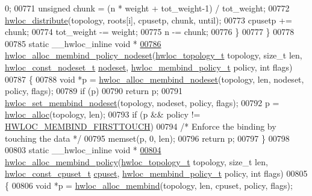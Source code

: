 \begin{DoxyCode}
      0;
00771     \textcolor{keywordtype}{unsigned} chunk = (n * weight + tot\_weight-1) / tot\_weight;
00772     \hyperlink{a00059_ga6d5c88292ad5aa062c1bebc99369c042}{hwloc_distribute}(topology, roots[i], cpusetp, chunk, until);
00773     cpusetp += chunk;
00774     tot\_weight -= weight;
00775     n -= chunk;
00776   \}
00777 \}
00778 
00785 \textcolor{keyword}{static} \_\_hwloc\_inline \textcolor{keywordtype}{void} *
\hypertarget{a00031_source_l00786}{}\hyperlink{a00059_ga3e772fbc4de626ed80f13d332b7d4d03}{00786} \hyperlink{a00059_ga3e772fbc4de626ed80f13d332b7d4d03}{hwloc_alloc_membind_policy_nodeset}(\hyperlink{a00039_ga9d1e76ee15a7dee158b786c30b6a6e38}{hwloc_topology_t} topology, \textcolor{keywordtype}{size\_t} len, 
      \hyperlink{a00040_ga2f5276235841ad66a79bedad16a5a10c}{hwloc_const_nodeset_t} \hyperlink{a00016_a08f0d0e16c619a6e653526cbee4ffea3}{nodeset}, \hyperlink{a00050_gac9764f79505775d06407b40f5e4661e8}{hwloc_membind_policy_t} policy, \textcolor{keywordtype}{int} flags)
00787 \{
00788   \textcolor{keywordtype}{void} *p = \hyperlink{a00050_gaeaa00714a9c4319bda0a74ca6f8720e8}{hwloc_alloc_membind_nodeset}(topology, len, nodeset, policy, flags);
00789   \textcolor{keywordflow}{if} (p)
00790     \textcolor{keywordflow}{return} p;
00791   \hyperlink{a00050_ga747962cbb16fd12ad6d126011c734a27}{hwloc_set_membind_nodeset}(topology, nodeset, policy, flags);
00792   p = \hyperlink{a00050_gac5586e58cf25c3596b7d4aa31ce13259}{hwloc_alloc}(topology, len);
00793   \textcolor{keywordflow}{if} (p && policy != \hyperlink{a00050_ggac9764f79505775d06407b40f5e4661e8a979c7aa78dd32780858f30f47a72cca0}{HWLOC_MEMBIND_FIRSTTOUCH})
00794     \textcolor{comment}{/* Enforce the binding by touching the data */}
00795     memset(p, 0, len);
00796   \textcolor{keywordflow}{return} p;
00797 \}
00798 
00803 \textcolor{keyword}{static} \_\_hwloc\_inline \textcolor{keywordtype}{void} *
\hypertarget{a00031_source_l00804}{}\hyperlink{a00059_ga6178c6a9ec1dd88ec9f6a9fcdcc7d634}{00804} \hyperlink{a00059_ga6178c6a9ec1dd88ec9f6a9fcdcc7d634}{hwloc_alloc_membind_policy}(\hyperlink{a00039_ga9d1e76ee15a7dee158b786c30b6a6e38}{hwloc_topology_t} topology, \textcolor{keywordtype}{size\_t} len, 
      \hyperlink{a00040_ga1f784433e9b606261f62d1134f6a3b25}{hwloc_const_cpuset_t} \hyperlink{a00016_a67925e0f2c47f50408fbdb9bddd0790f}{cpuset}, \hyperlink{a00050_gac9764f79505775d06407b40f5e4661e8}{hwloc_membind_policy_t} policy, \textcolor{keywordtype}{int} flags)
00805 \{
00806   \textcolor{keywordtype}{void} *p = \hyperlink{a00050_ga221a7edc5d436300374fa16463f607e5}{hwloc_alloc_membind}(topology, len, cpuset, policy, flags);

\end{DoxyCode}
